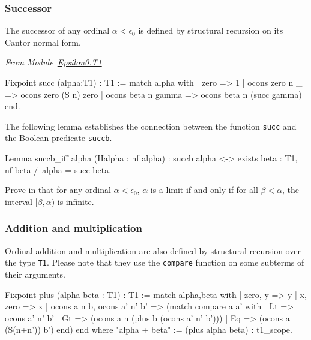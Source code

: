 \documentclass[a4paper]{book}
\begin{document}
\subsubsection{Successor}

The successor of any ordinal $\alpha< \epsilon_0$ is defined by structural 
recursion on its Cantor normal form.

\label{Functions:succ-T1}

\vspace{4pt}
\emph{From Module~\href{../src/html/hydras.Epsilon0.T1.html\#succ}{Epsilon0.T1}}

\begin{Coqsrc}
Fixpoint succ (alpha:T1) : T1 :=
  match alpha with 
   | zero => 1
   | ocons zero n _ => ocons zero (S n) zero
   | ocons beta n gamma => ocons beta n (succ gamma)
 end.
\end{Coqsrc}


The following lemma establishes the connection between the  function
\texttt{succ} and the Boolean predicate \texttt{succb}.


\begin{Coqsrc}
 Lemma succb_iff alpha (Halpha : nf alpha) :
  succb alpha <-> exists beta : T1, nf beta /\ alpha = succ  beta.
\end{Coqsrc}

 \begin{exercise}
Prove in \coq{} that for any ordinal $\alpha<\epsilon_0$, $\alpha$ is a limit if 
and only if for all $\beta<\alpha$, the interval $[\beta,\alpha)$ is infinite.
 \end{exercise}


\subsubsection{Addition and multiplication}

Ordinal addition and multiplication are also defined by structural recursion over the type \texttt{T1}. Please note that they use the \texttt{compare} function on some subterms of their arguments.

\label{sect:infix-plus-T1}

\begin{Coqsrc}
Fixpoint plus (alpha beta : T1) : T1 :=
  match alpha,beta with
 |  zero, y  => y
 |  x, zero  => x
 |  ocons a n b, ocons a' n' b' =>
    (match compare a a' with
     | Lt => ocons a' n' b'
     | Gt => (ocons a n (plus b (ocons a' n' b')))
     | Eq  => (ocons a (S(n+n')) b')
     end)
  end
where "alpha + beta" := (plus alpha beta) : t1_scope.
\end{Coqsrc}
\end{document}
